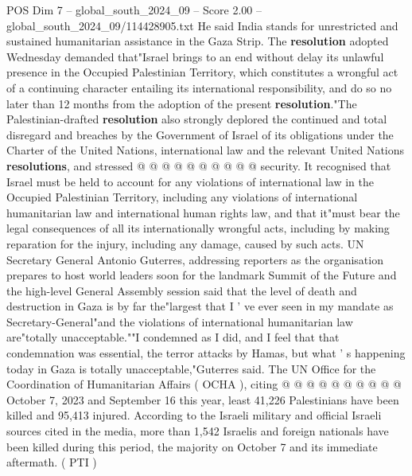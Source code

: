 \begin{textsample}{POS Dim 7 – global\_south\_2024\_09 – Score 2.00 – global\_south\_2024\_09/114428905.txt}
He said India stands for unrestricted and sustained humanitarian assistance in the Gaza Strip.
The \textbf{resolution} adopted Wednesday demanded that"Israel brings to an end without delay its unlawful presence in the Occupied Palestinian Territory, which constitutes a wrongful act of a continuing character entailing its international responsibility, and do so no later than 12 months from the adoption of the present \textbf{resolution}."The Palestinian-drafted \textbf{resolution} also strongly deplored the continued and total disregard and breaches by the Government of Israel of its obligations under the Charter of the United Nations, international law and the relevant United Nations \textbf{resolutions}, and stressed @ @ @ @ @ @ @ @ @ @ security.
It recognised that Israel must be held to account for any violations of international law in the Occupied Palestinian Territory, including any violations of international humanitarian law and international human rights law, and that it"must bear the legal consequences of all its internationally wrongful acts, including by making reparation for the injury, including any damage, caused by such acts.
UN Secretary General Antonio Guterres, addressing reporters as the organisation prepares to host world leaders soon for the landmark Summit of the Future and the high-level General Assembly session said that the level of death and destruction in Gaza is by far the"largest that I ' ve ever seen in my mandate as Secretary-General"and the violations of international humanitarian law are"totally unacceptable.""I condemned as I did, and I feel that that condemnation was essential, the terror attacks by Hamas, but what ' s happening today in Gaza is totally unacceptable,"Guterres said.
The UN Office for the Coordination of Humanitarian Affairs ( OCHA ), citing @ @ @ @ @ @ @ @ @ @ October 7, 2023 and September 16 this year, least 41,226 Palestinians have been killed and 95,413 injured.
According to the Israeli military and official Israeli sources cited in the media, more than 1,542 Israelis and foreign nationals have been killed during this period, the majority on October 7 and its immediate aftermath. ( PTI )

\end{textsample}
